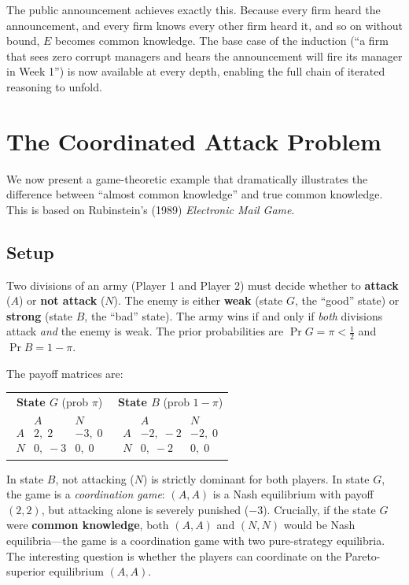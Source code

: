 The public announcement achieves exactly this. Because every firm heard the announcement, and every firm knows every other firm heard it, and so on without bound, $E$ becomes common knowledge. The base case of the induction (``a firm that sees zero corrupt managers and hears the announcement will fire its manager in Week 1'') is now available at every depth, enabling the full chain of iterated reasoning to unfold.

\section{The Coordinated Attack Problem}

We now present a game-theoretic example that dramatically illustrates the difference between ``almost common knowledge'' and true common knowledge. This is based on Rubinstein's (1989) \textit{Electronic Mail Game}.

\subsection{Setup}

Two divisions of an army (Player 1 and Player 2) must decide whether to \textbf{attack} ($A$) or \textbf{not attack} ($N$). The enemy is either \textbf{weak} (state $G$, the ``good'' state) or \textbf{strong} (state $B$, the ``bad'' state). The army wins if and only if \textit{both} divisions attack \textit{and} the enemy is weak. The prior probabilities are $\Pr{G} = \pi < \frac{1}{2}$ and $\Pr{B} = 1 - \pi$.

The payoff matrices are:

\begin{center}
\begin{tabular}{cc}
\textbf{State $G$} (prob $\pi$) & \textbf{State $B$} (prob $1-\pi$) \\[6pt]
$\begin{array}{c|cc}
 & A & N \\ \hline
A & 2,\;2 & -3,\;0 \\
N & 0,\;-3 & 0,\;0
\end{array}$
&
$\begin{array}{c|cc}
 & A & N \\ \hline
A & -2,\;-2 & -2,\;0 \\
N & 0,\;-2 & 0,\;0
\end{array}$
\end{tabular}
\end{center}

In state $B$, not attacking ($N$) is strictly dominant for both players. In state $G$, the game is a \textit{coordination game}: $(A, A)$ is a Nash equilibrium with payoff $(2,2)$, but attacking alone is severely punished ($-3$). Crucially, if the state $G$ were \textbf{common knowledge}, both $(A, A)$ and $(N, N)$ would be Nash equilibria---the game is a coordination game with two pure-strategy equilibria. The interesting question is whether the players can coordinate on the Pareto-superior equilibrium $(A, A)$.

